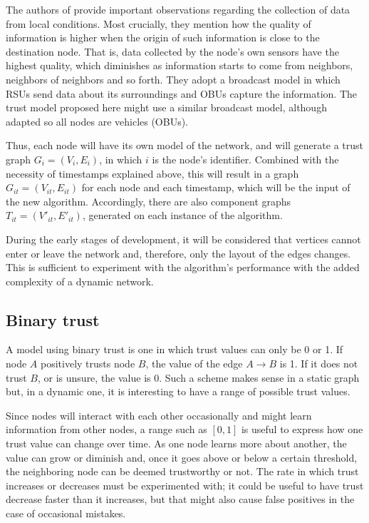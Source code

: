 The authors of \cite{patwardhan2006data} provide important observations regarding the collection of data from local conditions.
Most crucially, they mention how the quality of information is higher when the origin of such information is close to the destination node.
That is, data collected by the node's own sensors have the highest quality, which diminishes as information starts to come from neighbors, neighbors of neighbors and so forth.
They adopt a broadcast model in which RSUs send data about its surroundings and OBUs capture the information.
The trust model proposed here might use a similar broadcast model, although adapted so all nodes are vehicles (OBUs).

Thus, each node will have its own model of the network, and will generate a trust graph $G_i=(V_i, E_i)$, in which $i$ is the node's identifier.
Combined with the necessity of timestamps explained above, this will result in a graph $G_{it}=(V_{it}, E_{it})$ for each node and each timestamp, which will be the input of the new algorithm.
Accordingly, there are also component graphs $T_{it}=(V'_{it}, E'_{it})$, generated on each instance of the algorithm.

During the early stages of development, it will be considered that vertices cannot enter or leave the network and, therefore, only the layout of the edges changes.
This is sufficient to experiment with the algorithm's performance with the added complexity of a dynamic network.


\subsection{Binary trust}
A model using binary trust is one in which trust values can only be 0 or 1.
If node $A$ positively trusts node $B$, the value of the edge $A\rightarrow B$ is 1.
If it does not trust $B$, or is unsure, the value is 0.
Such a scheme makes sense in a static graph but, in a dynamic one, it is interesting to have a range of possible trust values.

Since nodes will interact with each other occasionally and might learn information from other nodes, a range such as $[0,1]$ is useful to express how one trust value can change over time.
As one node learns more about another, the value can grow or diminish and, once it goes above or below a certain threshold, the neighboring node can be deemed trustworthy or not.
The rate in which trust increases or decreases must be experimented with; it could be useful to have trust decrease faster than it increases, but that might also cause false positives in the case of occasional mistakes.

